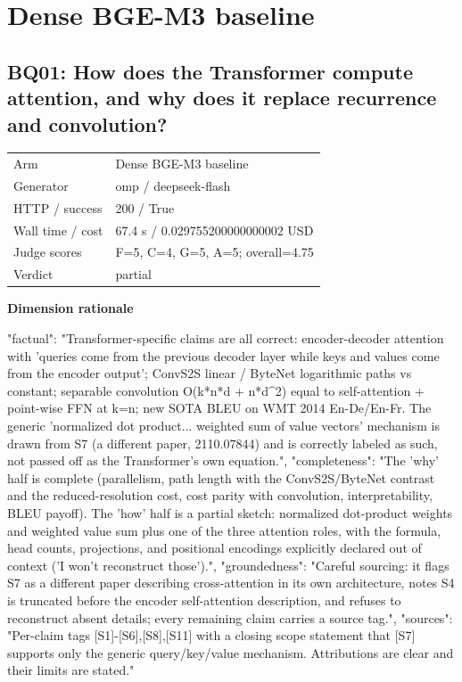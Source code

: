 \documentclass[10pt]{article}
\begin{document}
\section{Dense BGE-M3 baseline}
\subsection{BQ01: How does the Transformer compute attention, and why does it replace recurrence and convolution?}
\begin{tabular}{@{}ll@{}}
Arm & Dense BGE-M3 baseline\\
Generator & omp / deepseek-flash\\
HTTP / success & 200 / True\\
Wall time / cost & 67.4 s / 0.029755200000000002 USD\\
Judge scores & F=5, C=4, G=5, A=5; overall=4.75\\
Verdict & partial\\
\end{tabular}

\textbf{Dimension rationale}
\begin{EvidenceText}
{
  "factual": "Transformer-specific claims are all correct: encoder-decoder attention with 'queries come from the previous decoder layer while keys and values come from the encoder output'; ConvS2S linear / ByteNet logarithmic paths vs constant; separable convolution O(k*n*d + n*d^2) equal to self-attention + point-wise FFN at k=n; new SOTA BLEU on WMT 2014 En-De/En-Fr. The generic 'normalized dot product... weighted sum of value vectors' mechanism is drawn from S7 (a different paper, 2110.07844) and is correctly labeled as such, not passed off as the Transformer's own equation.",
  "completeness": "The 'why' half is complete (parallelism, path length with the ConvS2S/ByteNet contrast and the reduced-resolution cost, cost parity with convolution, interpretability, BLEU payoff). The 'how' half is a partial sketch: normalized dot-product weights and weighted value sum plus one of the three attention roles, with the formula, head counts, projections, and positional encodings explicitly declared out of context ('I won't reconstruct those').",
  "groundedness": "Careful sourcing: it flags S7 as a different paper describing cross-attention in its own architecture, notes S4 is truncated before the encoder self-attention description, and refuses to reconstruct absent details; every remaining claim carries a source tag.",
  "sources": "Per-claim tags [S1]-[S6],[S8],[S11] with a closing scope statement that [S7] supports only the generic query/key/value mechanism. Attributions are clear and their limits are stated."
}
\end{EvidenceText}
\end{document}

